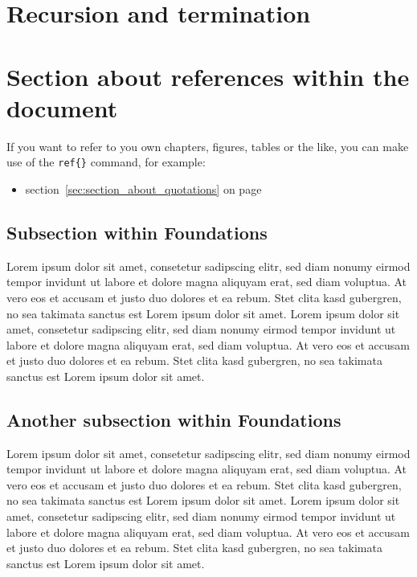 \documentclass[a4paper]{article}
\begin{document}
\section{Recursion and termination}


\section{Section about references within the document}
\label{sec:section_about_references_within_the_document}

If you want to refer to you own chapters, figures, tables or the like, you can make use of the \texttt{ref\{\}} command, for example:
\begin{itemize}
	\item section~\ref{sec:section_about_quotations} on page \pageref{sec:section_about_quotations}
\end{itemize}




\subsection{Subsection within Foundations} %
\label{sub:subsection_within_foundations}
Lorem ipsum dolor sit amet, consetetur sadipscing elitr, sed diam nonumy eirmod tempor invidunt ut labore et dolore magna aliquyam erat, sed diam voluptua. At vero eos et accusam et justo duo dolores et ea rebum. Stet clita kasd gubergren, no sea takimata sanctus est Lorem ipsum dolor sit amet. Lorem ipsum dolor sit amet, consetetur sadipscing elitr, sed diam nonumy eirmod tempor invidunt ut labore et dolore magna aliquyam erat, sed diam voluptua. At vero eos et accusam et justo duo dolores et ea rebum. Stet clita kasd gubergren, no sea takimata sanctus est Lorem ipsum dolor sit amet.

\subsection{Another subsection within Foundations} %
\label{sub:another_subsection_within_foundations}
Lorem ipsum dolor sit amet, consetetur sadipscing elitr, sed diam nonumy eirmod tempor invidunt ut labore et dolore magna aliquyam erat, sed diam voluptua. At vero eos et accusam et justo duo dolores et ea rebum. Stet clita kasd gubergren, no sea takimata sanctus est Lorem ipsum dolor sit amet. Lorem ipsum dolor sit amet, consetetur sadipscing elitr, sed diam nonumy eirmod tempor invidunt ut labore et dolore magna aliquyam erat, sed diam voluptua. At vero eos et accusam et justo duo dolores et ea rebum. Stet clita kasd gubergren, no sea takimata sanctus est Lorem ipsum dolor sit amet.
\end{document}

